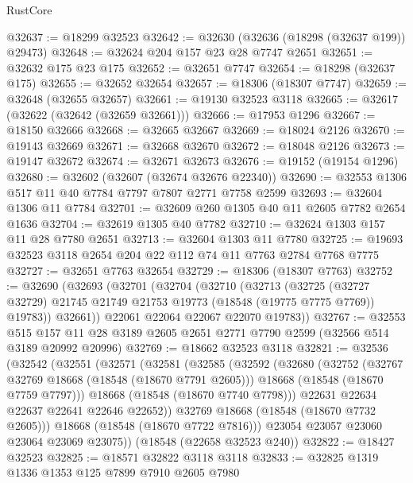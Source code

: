 \begin{lexlean}{RustCore}
\begin{coremodule}
@32637 := @18299 @32523
@32642 := @32630 (@32636 (@18298 (@32637 @199)) @29473)
@32648 := @32624 @204 @157 @23 @28 @7747 @2651
@32651 := @32632 @175 @23 @175
@32652 := @32651 @7747
@32654 := @18298 (@32637 @175)
@32655 := @32652 @32654
@32657 := @18306 (@18307 @7747)
@32659 := @32648 (@32655 @32657)
@32661 := @19130 @32523 @3118
@32665 := @32617 (@32622 (@32642 (@32659 @32661)))
@32666 := @17953 @1296
@32667 := @18150 @32666
@32668 := @32665 @32667
@32669 := @18024 @2126
@32670 := @19143 @32669
@32671 := @32668 @32670
@32672 := @18048 @2126
@32673 := @19147 @32672
@32674 := @32671 @32673
@32676 := @19152 (@19154 @1296)
@32680 := @32602 (@32607 (@32674 @32676 @22340))
@32690 := @32553 @1306 @517 @11 @40 @7784 @7797 @7807 @2771 @7758 @2599
@32693 := @32604 @1306 @11 @7784
@32701 := @32609 @260 @1305 @40 @11 @2605 @7782 @2654 @1636
@32704 := @32619 @1305 @40 @7782
@32710 := @32624 @1303 @157 @11 @28 @7780 @2651
@32713 := @32604 @1303 @11 @7780
@32725 := @19693 @32523 @3118 @2654 @204 @22 @112 @74 @11 @7763 @2784 @7768 @7775
@32727 := @32651 @7763 @32654
@32729 := @18306 (@18307 @7763)
@32752 := @32690
    (@32693
      (@32701
        (@32704
          (@32710
            (@32713
              (@32725
                (@32727 @32729)
                @21745
                @21749
                @21753
                @19773
                (@18548 (@19775 @7775 @7769))
                @19783))
            @32661))
        @22061
        @22064
        @22067
        @22070
        @19783))
@32767 := @32553
    @515
    @157
    @11
    @28
    @3189
    @2605
    @2651
    @2771
    @7790
    @2599
    (@32566 @514 @3189 @20992 @20996)
@32769 := @18662 @32523 @3118
@32821 := @32536
    (@32542
      (@32551
        (@32571
          (@32581
            (@32585
              (@32592
                (@32680
                  (@32752
                    (@32767 @32769 @18668 (@18548 (@18670 @7791 @2605)))
                    @18668
                    (@18548 (@18670 @7759 @7797)))
                  @18668
                  (@18548 (@18670 @7740 @7798)))
                @22631
                @22634
                @22637
                @22641
                @22646
                @22652))
            @32769
            @18668
            (@18548 (@18670 @7732 @2605)))
          @18668
          (@18548 (@18670 @7722 @7816)))
        @23054
        @23057
        @23060
        @23064
        @23069
        @23075))
    (@18548 (@22658 @32523 @240))
@32822 := @18427 @32523
@32825 := @18571 @32822 @3118 @3118
@32833 := @32825 @1319 @1336 @1353 @125 @7899 @7910 @2605 @7980

\end{coremodule}
\end{lexlean}
